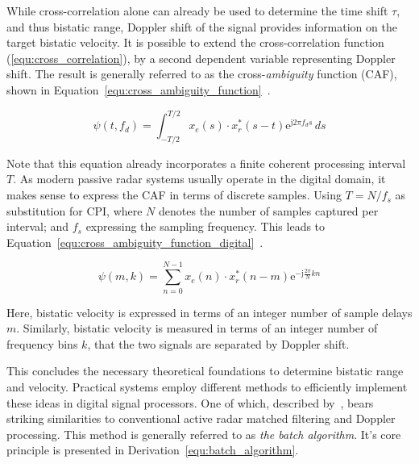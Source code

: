 While cross-correlation alone can already be used to determine the time shift \(\tau\), and thus bistatic range, Doppler shift of the signal provides information on the target bistatic velocity. It is possible to extend the cross-correlation function (\ref{equ:cross_correlation}), by a second dependent variable representing Doppler shift. The result is generally referred to as the cross-\emph{ambiguity} function (CAF), shown in Equation~\ref{equ:cross_ambiguity_function}~\cite[p.~132]{Malanowski2019}.

\begin{equation}\label{equ:cross_ambiguity_function}
    \psi(t, f_{d}) = \int_{-T/2}^{T/2} {x_{e}(s) \cdot x_{r}^{*}} \left( s - t \right)\mathrm{e}^{\mathrm{j} 2 \pi f_{d} s} \, d s
\end{equation}

Note that this equation already incorporates a finite coherent processing interval \(T\). As modern passive radar systems usually operate in the digital domain, it makes sense to express the CAF in terms of discrete samples. Using \(T = N / f_{s}\) as substitution for CPI, where \(N\) denotes the number of samples captured per interval; and \(f_{s}\) expressing the sampling frequency. This leads to Equation~\ref{equ:cross_ambiguity_function_digital}~\cite[p.~134]{Malanowski2019}.

\begin{equation}\label{equ:cross_ambiguity_function_digital}
    \psi(m,k) = \sum_{n = 0}^{N - 1}{x_{e}(n) \cdot x_{r}^{*}(n - m) \mathrm{e}^{-\mathrm{j} \frac{2 \pi}{N} k n}}
\end{equation}

Here, bistatic velocity is expressed in terms of an integer number of sample delays \(m\). Similarly, bistatic velocity is measured in terms of an integer number of frequency bins \(k\), that the two signals are separated by Doppler shift.

This concludes the necessary theoretical foundations to determine bistatic range and velocity. Practical systems employ different methods to efficiently implement these ideas in digital signal processors. One of which, described by~\cite[p.~138]{Malanowski2019}, bears striking similarities to conventional active radar matched filtering and Doppler processing. This method is generally referred to as \emph{the batch algorithm}. It's core principle is presented in Derivation~\ref{equ:batch_algorithm}.

